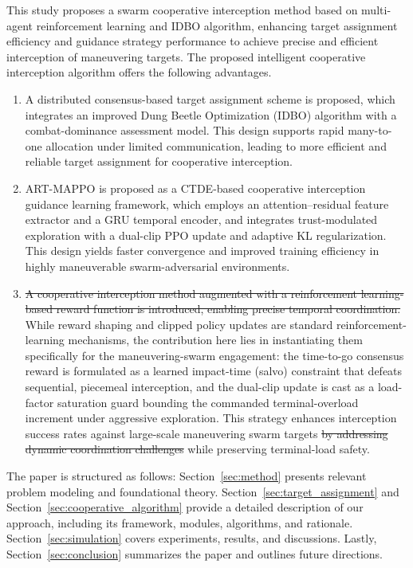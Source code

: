 \documentclass[lettersize,journal]{IEEEtran}
\newcommand{\hladd}[1]{{\color{blue}#1}}
\newcommand{\hldel}[1]{{\color{red}\sout{#1}}}
\begin{document}
This study proposes a swarm cooperative interception method based on multi-agent reinforcement
learning and IDBO algorithm, enhancing target assignment efficiency and guidance strategy
performance to achieve precise and efficient interception of maneuvering targets.
The proposed intelligent cooperative interception algorithm offers the following advantages.

\begin{enumerate}
\item A distributed consensus-based target assignment scheme is proposed, which integrates an
improved Dung Beetle Optimization (IDBO) algorithm with a combat-dominance assessment model.
This design supports rapid many-to-one allocation under limited communication, leading to more
efficient and reliable target assignment for cooperative interception.

\item ART-MAPPO is proposed as a CTDE-based cooperative interception guidance learning
framework, which employs an attention--residual feature extractor and a GRU temporal encoder,
and integrates trust-modulated exploration with a dual-clip PPO update and adaptive KL
regularization. This design yields faster convergence and improved training efficiency in
highly maneuverable swarm-adversarial environments.

\item \hldel{A cooperative interception method augmented with a reinforcement learning-based reward
function is introduced, enabling precise temporal coordination.} \hladd{While reward shaping and
clipped policy updates are standard reinforcement-learning mechanisms, the contribution here lies
in instantiating them specifically for the maneuvering-swarm engagement: the time-to-go consensus
reward is formulated as a learned impact-time (salvo) constraint that defeats sequential, piecemeal
interception, and the dual-clip update is cast as a load-factor saturation guard bounding the
commanded terminal-overload increment under aggressive exploration.} This strategy enhances
interception success rates against large-scale maneuvering swarm targets\hldel{ by addressing dynamic
coordination challenges}\hladd{ while preserving terminal-load safety}.
\end{enumerate}

The paper is structured as follows: Section~\ref{sec:method} presents relevant problem modeling and foundational theory. Section~\ref{sec:target_assignment} and Section~\ref{sec:cooperative_algorithm} provide a detailed description of our approach, including its framework, modules, algorithms, and rationale. Section~\ref{sec:simulation} covers experiments, results, and discussions. Lastly, Section~\ref{sec:conclusion} summarizes the paper and outlines future directions.
\end{document}
